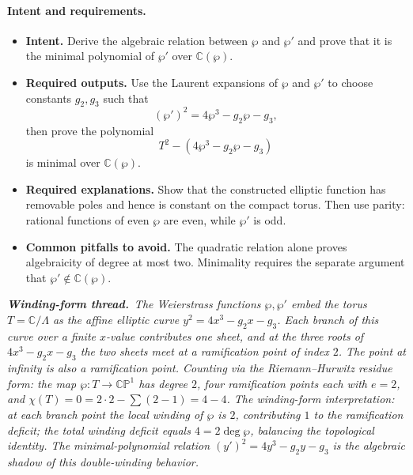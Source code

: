 \documentclass[11pt]{article}
\newcommand{\windingnote}[1]{%
\par\smallskip
\noindent\begin{minipage}{\linewidth}%
\color{windingblue}\small%
\textbf{\textit{Winding-form thread.}}\ \textit{#1}%
\end{minipage}\par\smallskip%
}
\newcommand{\C}{\mathbb{C}}
\newcommand{\CP}{\mathbb{CP}}
\newenvironment{intentrequirements}{%
\paragraph{Intent and requirements.}
\begin{itemize}[leftmargin=*, itemsep=0.25em]
}{%
\end{itemize}
}
\begin{document}
\begin{intentrequirements}
\item \textbf{Intent.} Derive the algebraic relation between $\wp$ and $\wp'$ and prove that it is the minimal polynomial of $\wp'$ over $\C(\wp)$.
\item \textbf{Required outputs.} Use the Laurent expansions of $\wp$ and $\wp'$ to choose constants $g_2,g_3$ such that
\[
 (\wp')^2=4\wp^3-g_2\wp-g_3,
\]
then prove the polynomial
\[
 T^2-(4\wp^3-g_2\wp-g_3)
\]
is minimal over $\C(\wp)$.
\item \textbf{Required explanations.} Show that the constructed elliptic function has removable poles and hence is constant on the compact torus. Then use parity: rational functions of even $\wp$ are even, while $\wp'$ is odd.
\item \textbf{Common pitfalls to avoid.} The quadratic relation alone proves algebraicity of degree at most two. Minimality requires the separate argument that $\wp'\notin\C(\wp)$.
\end{intentrequirements}

\windingnote{The Weierstrass functions $\wp,\wp'$ embed the torus $T=\C/\Lambda$ as the affine elliptic curve $y^2=4x^3-g_2x-g_3$. Each branch of this curve over a finite $x$-value contributes one sheet, and at the three roots of $4x^3-g_2x-g_3$ the two sheets meet at a ramification point of index $2$. The point at infinity is also a ramification point. Counting via the Riemann--Hurwitz residue form: the map $\wp:T\to\CP^1$ has degree $2$, four ramification points each with $e=2$, and $\chi(T)=0=2\cdot 2-\sum(2-1)=4-4$. The winding-form interpretation: at each branch point the local winding of $\wp$ is $2$, contributing $1$ to the ramification deficit; the total winding deficit equals $4=2\deg\wp$, balancing the topological identity. The minimal-polynomial relation $(y')^2=4y^3-g_2y-g_3$ is the algebraic shadow of this double-winding behavior.}
\end{document}
